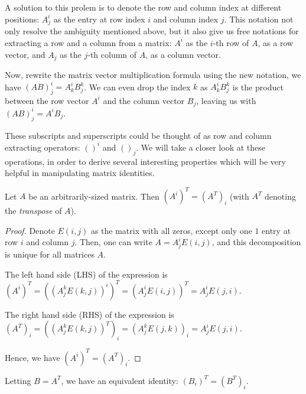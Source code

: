 A solution to this prolem is to denote the row and column index at different
positions: \( A^{i}_{j}    \) as the entry at row index \( i \) and column index
\( j \). This notation not only resolve the ambiguity mentioned above, but it
also give us free notations for extracting a row and a column from a matrix: \(
A^{i} \) as the \( i \)-th row of \( A \), as a row vector, and \( A_{j} \) as
the \( j \)-th column of \( A \), as a column vector.

Now, rewrite the matrix vector multiplication formula using the new notation, we
have \( (AB)^{i}_{j} = A^{i}_{k}B^{k}_{j}  \). We can even drop the index \( k
\) as \( A^{i}_{k}B^{k}_{j}  \) is the product between the row vector \( A^{i}
\) and the column vector \( B_{j}\), leaving us with \( (AB)^{i}_{j} = A^{i}
B_{j}  \).

These subscripts and superscripts could be thought of as row and column
extracting operators: \( ()^{i} \) and \( ()_{j} \). We will take a closer look
at these operations, in order to derive several interesting properties which
will be very helpful in manipulating matrix identities.

\begin{theorem}
  Let \( A \) be an arbitrarily-sized matrix. Then \( (A^{i})^{T} = (A^{T}
  )_{i} \) (with \( A^{T}  \) denoting the \textit{transpose} of \( A \)).
\end{theorem}

\begin{proof}
  Denote \( E(i, j) \) as the matrix with all zeros, except only one \( 1 \)
  entry at row \( i \) and column \( j \). Then, one can write \(
  A=A^{i}_{j}E(i, j) \), and this decomposition is unique for all matrices
  \( A \).

  The left hand side (LHS) of the expression is \( (A^{i})^{T} = ((A^{k}_{j}E(k,
  j))^{i})^{T} = (A^{i}_{j}E(i, j))^{T} = A^{i}_{j}E(j, i)   \).

  The right hand side (RHS) of the expression is \( (A^{T}
  )_{i}=((A^{k}_{j}E(k, j))^{T} )_{i} = (A^{k}_{j}E(j, k))_{i} = A^{i}_{j}E(j,
  i) \).

  Hence, we have \( (A^{i})^{T} = (A^{T} )_{i}  \).
\end{proof}

Letting \( B=A^{T}  \), we have an equivalent identity: \( (B_{i})^{T} =
(B^{T})_{i} \).

